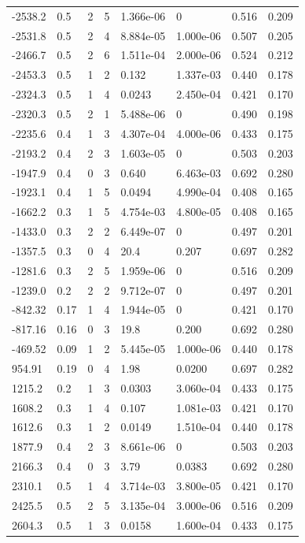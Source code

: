 \documentclass[preview]{standalone}
\begin{document}
{{\begin{tabular}{L{1.2cm}C{1.2cm} C{0.3cm}C{0.5cm} C{1.4cm}C{1.4cm} C{1.4cm}C{1.4cm}}
  -2538.2  &   0.5  & 2     &  5 &  1.366e-06  & 0  & 0.516 &  0.209   \\ 
  -2531.8  &   0.5  & 2     &  4 &  8.884e-05  & 1.000e-06  & 0.507 &  0.205   \\ 
  -2466.7  &   0.5  & 2     &  6 &  1.511e-04  & 2.000e-06  & 0.524 &  0.212   \\ 
  -2453.3  &   0.5  & 1     &  2 &  0.132  & 1.337e-03  & 0.440 &  0.178   \\ 
  -2324.3  &   0.5  & 1     &  4 &  0.0243  & 2.450e-04  & 0.421 &  0.170   \\ 
  -2320.3  &   0.5  & 2     &  1 &  5.488e-06  & 0  & 0.490 &  0.198   \\ 
  -2235.6  &   0.4  & 1     &  3 &  4.307e-04  & 4.000e-06  & 0.433 &  0.175   \\ 
  -2193.2  &   0.4  & 2     &  3 &  1.603e-05  & 0  & 0.503 &  0.203   \\ 
  -1947.9  &   0.4  & 0     &  3 &  0.640  & 6.463e-03  & 0.692 &  0.280   \\ 
  -1923.1  &   0.4  & 1     &  5 &  0.0494  & 4.990e-04  & 0.408 &  0.165   \\ 
  -1662.2  &   0.3  & 1     &  5 &  4.754e-03  & 4.800e-05  & 0.408 &  0.165   \\ 
  -1433.0  &   0.3  & 2     &  2 &  6.449e-07  & 0  & 0.497 &  0.201   \\ 
  -1357.5  &   0.3  & 0     &  4 &  20.4  & 0.207  & 0.697 &  0.282   \\ 
  -1281.6  &   0.3  & 2     &  5 &  1.959e-06  & 0  & 0.516 &  0.209   \\ 
  -1239.0  &   0.2  & 2     &  2 &  9.712e-07  & 0  & 0.497 &  0.201   \\ 
  -842.32  &  0.17  & 1     &  4 &  1.944e-05  & 0  & 0.421 &  0.170   \\ 
  -817.16  &  0.16  & 0     &  3 &  19.8  & 0.200  & 0.692 &  0.280   \\ 
  -469.52  &  0.09  & 1     &  2 &  5.445e-05  & 1.000e-06  & 0.440 &  0.178   \\ 
  954.91  &  0.19  & 0     &  4 &  1.98  & 0.0200  & 0.697 &  0.282   \\ 
  1215.2  &   0.2  & 1     &  3 &  0.0303  & 3.060e-04  & 0.433 &  0.175   \\ 
  1608.2  &   0.3  & 1     &  4 &  0.107  & 1.081e-03  & 0.421 &  0.170   \\ 
  1612.6  &   0.3  & 1     &  2 &  0.0149  & 1.510e-04  & 0.440 &  0.178   \\ 
  1877.9  &   0.4  & 2     &  3 &  8.661e-06  & 0  & 0.503 &  0.203   \\ 
  2166.3  &   0.4  & 0     &  3 &  3.79  & 0.0383  & 0.692 &  0.280   \\ 
  2310.1  &   0.5  & 1     &  4 &  3.714e-03  & 3.800e-05  & 0.421 &  0.170   \\ 
  2425.5  &   0.5  & 2     &  5 &  3.135e-04  & 3.000e-06  & 0.516 &  0.209   \\ 
  2604.3  &   0.5  & 1     &  3 &  0.0158  & 1.600e-04  & 0.433 &  0.175   \\ 
\hline 
\end{tabular} 

}}
\end{document}
